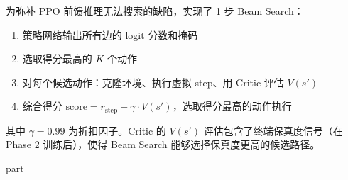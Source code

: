 为弥补 PPO 前馈推理无法搜索的缺陷，实现了 1 步 Beam Search：

\begin{enumerate}
  \item 策略网络输出所有边的 logit 分数和掩码
  \item 选取得分最高的 $K$ 个动作
  \item 对每个候选动作：克隆环境、执行虚拟 step、用 Critic 评估 $V(s')$
  \item 综合得分 $\text{score} = r_{\text{step}} + \gamma \cdot V(s')$，选取得分最高的动作执行
\end{enumerate}

其中 $\gamma = 0.99$ 为折扣因子。Critic 的 $V(s')$ 评估包含了终端保真度信号（在 Phase 2 训练后），使得 Beam Search 能够选择保真度更高的候选路径。

{part}

